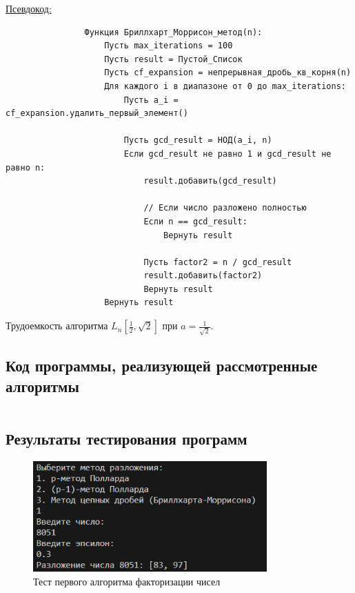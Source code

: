 \documentclass[bachelor, och, labwork]{shiza}
\begin{document}
        \underline{Псевдокод:}
            \begin{verbatim}
                Функция Бриллхарт_Моррисон_метод(n):
                    Пусть max_iterations = 100
                    Пусть result = Пустой_Список
                    Пусть cf_expansion = непрерывная_дробь_кв_корня(n)
                    Для каждого i в диапазоне от 0 до max_iterations:
                        Пусть a_i = cf_expansion.удалить_первый_элемент()
                
                        Пусть gcd_result = НОД(a_i, n)
                        Если gcd_result не равно 1 и gcd_result не равно n:
                            result.добавить(gcd_result)
                
                            // Если число разложено полностью
                            Если n == gcd_result:
                                Вернуть result
                
                            Пусть factor2 = n / gcd_result
                            result.добавить(factor2)
                            Вернуть result
                    Вернуть result
            \end{verbatim}

            Трудоемкость алгоритма $L_n[\frac{1}{2}, \sqrt{2}]$ при $a = \frac{1}{\sqrt{2}}$.\\
    
    \subsection{Код программы, реализующей рассмотренные алгоритмы}

        \inputminted[breaklines,fontsize=\small,linenos]{rust}{../code/src/main.rs}

    \subsection{Результаты тестирования программ}
        \begin{figure}[H]
            \centering
            \includegraphics[width=0.8\textwidth]{pic/1.png}
            \caption{Тест первого алгоритма факторизации чисел}
        \end{figure}
\end{document}
